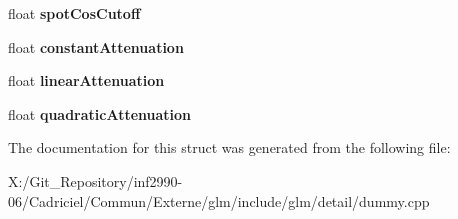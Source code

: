 \begin{DoxyCompactItemize}
\item 
\hypertarget{structlight_a25376f0a1e32235d50ef14edfa18bfb3}{float {\bfseries spot\-Cos\-Cutoff}}\label{structlight_a25376f0a1e32235d50ef14edfa18bfb3}

\item 
\hypertarget{structlight_a788e3a9fbc05cd748dd6a181b6043892}{float {\bfseries constant\-Attenuation}}\label{structlight_a788e3a9fbc05cd748dd6a181b6043892}

\item 
\hypertarget{structlight_aea11b1222a4d5c42f5d69e31751e6fac}{float {\bfseries linear\-Attenuation}}\label{structlight_aea11b1222a4d5c42f5d69e31751e6fac}

\item 
\hypertarget{structlight_afe2993ec0463d57b374b8f5a27f2dfa7}{float {\bfseries quadratic\-Attenuation}}\label{structlight_afe2993ec0463d57b374b8f5a27f2dfa7}

\end{DoxyCompactItemize}


The documentation for this struct was generated from the following file\-:\begin{DoxyCompactItemize}
\item 
X\-:/\-Git\-\_\-\-Repository/inf2990-\/06/\-Cadriciel/\-Commun/\-Externe/glm/include/glm/detail/dummy.\-cpp\end{DoxyCompactItemize}
